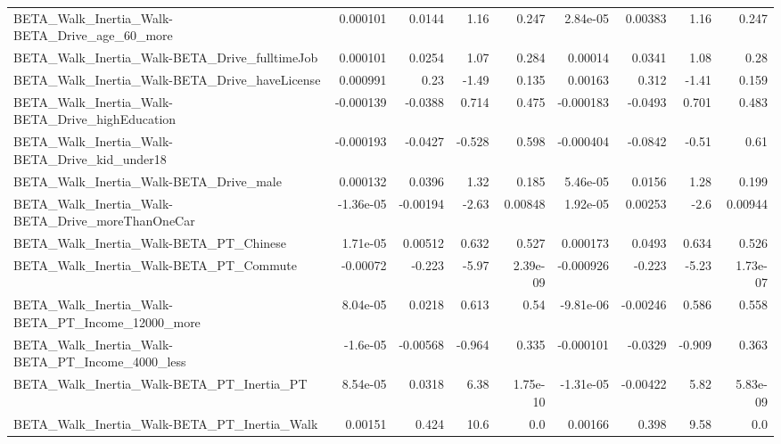 \begin{tabular}{lrrrrrrrr}
BETA\_Walk\_Inertia\_Walk-BETA\_Drive\_age\_60\_more      &    0.000101 &       0.0144 &     1.16 &    0.247 &   2.84e-05 &     0.00383 &         1.16 &         0.247 \\
BETA\_Walk\_Inertia\_Walk-BETA\_Drive\_fulltimeJob      &    0.000101 &       0.0254 &     1.07 &    0.284 &    0.00014 &      0.0341 &         1.08 &          0.28 \\
BETA\_Walk\_Inertia\_Walk-BETA\_Drive\_haveLicense      &    0.000991 &         0.23 &    -1.49 &    0.135 &    0.00163 &       0.312 &        -1.41 &         0.159 \\
BETA\_Walk\_Inertia\_Walk-BETA\_Drive\_highEducation    &   -0.000139 &      -0.0388 &    0.714 &    0.475 &  -0.000183 &     -0.0493 &        0.701 &         0.483 \\
BETA\_Walk\_Inertia\_Walk-BETA\_Drive\_kid\_under18      &   -0.000193 &      -0.0427 &   -0.528 &    0.598 &  -0.000404 &     -0.0842 &        -0.51 &          0.61 \\
BETA\_Walk\_Inertia\_Walk-BETA\_Drive\_male             &    0.000132 &       0.0396 &     1.32 &    0.185 &   5.46e-05 &      0.0156 &         1.28 &         0.199 \\
BETA\_Walk\_Inertia\_Walk-BETA\_Drive\_moreThanOneCar   &   -1.36e-05 &     -0.00194 &    -2.63 &  0.00848 &   1.92e-05 &     0.00253 &         -2.6 &       0.00944 \\
BETA\_Walk\_Inertia\_Walk-BETA\_PT\_Chinese             &    1.71e-05 &      0.00512 &    0.632 &    0.527 &   0.000173 &      0.0493 &        0.634 &         0.526 \\
BETA\_Walk\_Inertia\_Walk-BETA\_PT\_Commute             &    -0.00072 &       -0.223 &    -5.97 & 2.39e-09 &  -0.000926 &      -0.223 &        -5.23 &      1.73e-07 \\
BETA\_Walk\_Inertia\_Walk-BETA\_PT\_Income\_12000\_more   &    8.04e-05 &       0.0218 &    0.613 &     0.54 &  -9.81e-06 &    -0.00246 &        0.586 &         0.558 \\
BETA\_Walk\_Inertia\_Walk-BETA\_PT\_Income\_4000\_less    &    -1.6e-05 &     -0.00568 &   -0.964 &    0.335 &  -0.000101 &     -0.0329 &       -0.909 &         0.363 \\
BETA\_Walk\_Inertia\_Walk-BETA\_PT\_Inertia\_PT          &    8.54e-05 &       0.0318 &     6.38 & 1.75e-10 &  -1.31e-05 &    -0.00422 &         5.82 &      5.83e-09 \\
BETA\_Walk\_Inertia\_Walk-BETA\_PT\_Inertia\_Walk        &     0.00151 &        0.424 &     10.6 &      0.0 &    0.00166 &       0.398 &         9.58 &           0.0 \\

\end{tabular}
